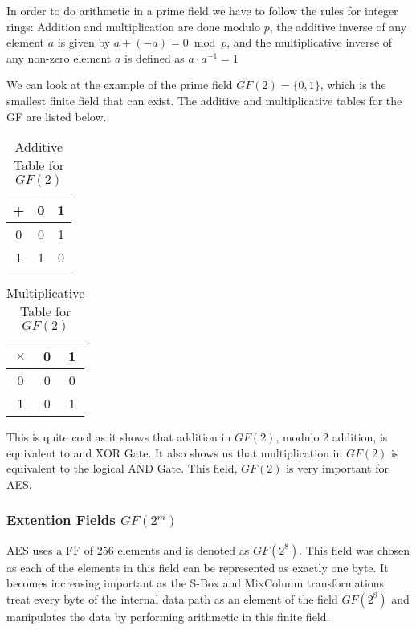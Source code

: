 In order to do arithmetic in a prime field we have to follow the rules for integer rings:  Addition and multiplication are done modulo $p$, the additive inverse of any element $a$ is given by $a + (-a) = 0 \bmod p$, and the multiplicative inverse of any non-zero element $a$ is defined as $a \cdot a^{-1} = 1$ 

We can look at the example of the prime field $GF(2) = \{0,1\}$, which is the smallest finite field that can exist. The additive and multiplicative tables for the GF are listed below.


\begin{table}[h!]
\begin{center}
\begin{tabular}{ |c|cc| } 
 \hline
 + & 0 & 1 \\ 
 \hline
 0 & 0 & 1 \\ 
 1 & 1 & 0 \\ 
 \hline
\end{tabular}
\caption{Additive Table for $GF(2)$}
\label{GF-2-Addition}
\end{center}
\end{table}

\begin{table}[h!]
\begin{center}
\begin{tabular}{ |c|cc| } 
 \hline
 $\times$ & 0 & 1 \\ 
 \hline
 0 & 0 & 0 \\ 
 1 & 0 & 1 \\ 
 \hline
\end{tabular}
\caption{Multiplicative Table for $GF(2)$}
\label{GF-2-Multiplicative}
\end{center}
\end{table}

This is quite cool as it shows that addition in $GF(2)$, modulo 2 addition, is equivalent to and XOR Gate. It also shows us that multiplication in $GF(2)$ is equivalent to the logical AND Gate. This field, $GF(2)$ is very important for AES.

\subsubsection{Extention Fields $GF(2^m)$}  

AES uses a FF of 256 elements and is denoted as $GF(2^8)$. This field was chosen as each of the elements in this field can be represented as exactly one byte. It becomes increasing important as the S-Box and MixColumn transformations treat every byte of the internal data path as an element of the field $GF(2^8)$ and manipulates the data by performing arithmetic in this finite field.

